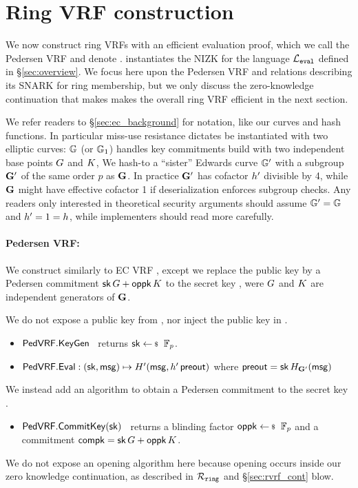 \section{Ring VRF construction}%
\label{sec:pederson_vrf}

We now construct ring VRFs with an efficient evaluation proof, which
we call the Pedersen VRF and denote \PedVRF.
\PedVRF instantiates the NIZK for the language $\mathcal{L}_{\mathtt{eval}}$ defined in \S\ref{sec:overview}.
We focus here upon the Pedersen VRF and relations describing its SNARK
for ring membership, but we only discuss the zero-knowledge continuation
that makes makes the overall ring VRF efficient in the next section.

We refer readers to \S\ref{sec:ec_background} for notation,
 like our curves and hash functions.
In particular miss-use resistance dictates \PedVRF be instantiated with
two elliptic curves: ${\mathbb{G}}$ (or ${\mathbb{G}}_1$) handles key commitments
 build with two independent base points $G$ and $K$,
We hash-to a ``sister'' Edwards curve ${\mathbb{G}'}$ with a subgroup ${\mathbf{G}'}$
 of the same order $p$ as ${\mathbf{G}}$.
In practice ${\mathbf{G}'}$ has cofactor ${h'}$ divisible by 4, while
 ${\mathbf{G}}$ might have effective cofactor 1 if deserialization enforces subgroup checks.
Any readers only interested in theoretical security arguments
should assume ${\mathbb{G}'} = {\mathbb{G}}$ and ${h'} = 1 = h$,
 while implementers should read more carefully.

\paragraph{Pedersen VRF:} 
We construct \PedVRF similarly to EC VRF
 \cite{nsec5,VXEd25519,draft-irtf-cfrg-vrf-10},
except we replace the public key by a Pedersen commitment
 $\mathsf{sk} \, G + \mathsf{oppk} \, K$ to the secret key \sk,
 were $G$ and $K$ are independent generators of ${\mathbf{G}}$.

We do not expose a public key from \KeyGen, nor inject the public key in \Eval.
\begin{itemize}
    \item ${\mathsf{PedVRF}}.{\mathsf{KeyGen}}$ \, returns $\sk \leftsample \F_p$. %
    \item ${\mathsf{PedVRF}}.{\mathsf{Eval}} : (\mathsf{sk},\mathsf{msg}) \mapsto H'(\mathsf{msg}, {h'}\,{\mathsf{preout}})$ where ${\mathsf{preout}} = \mathsf{sk} \, H_{{\mathbf{G}'}}(\mathsf{msg})$
\end{itemize}
\noindent We instead add an algorithm to obtain a Pedersen commitment to the secret key \sk.
\begin{itemize}
    \item ${\mathsf{PedVRF}}.{\mathsf{CommitKey}}(\mathsf{sk})$ \,
    returns a blinding factor $\openpk \leftsample \F_p$
    and a commitment $\mathsf{compk} = \mathsf{sk} \, G + \mathsf{oppk} \, K$.
\end{itemize}
We do not expose an opening algorithm here because opening occurs inside
our zero knowledge continuation,
 as described in $\mathcal{R}_{\mathtt{ring}}$ and \S\ref{sec:rvrf_cont} blow.

